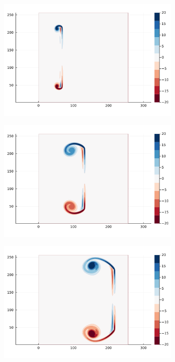 \documentclass{article}
\begin{document}
\begin{figure}
    \centering
    \begin{subfigure}{.33\textwidth}
        \centering
        \includegraphics[width=\textwidth]{tex/fig/Disk_reflect_omega_1.png}
    \end{subfigure}%
    \begin{subfigure}{.33\textwidth}
        \centering
        \includegraphics[width=\textwidth]{tex/fig/Disk_reflect_omega_2.png}
    \end{subfigure}%
    \begin{subfigure}{.33\textwidth}
        \centering
        \includegraphics[width=\textwidth]{tex/fig/Disk_reflect_omega_3.png}

\end{subfigure}
\end{figure}
\end{document}
